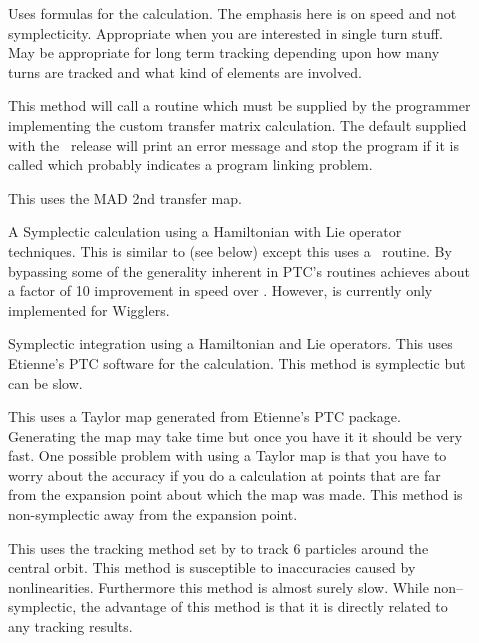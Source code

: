 \begin{description}

\item[]
Uses formulas for the calculation. The emphasis here is on speed and not
symplecticity. Appropriate when you are interested in single turn
stuff. May be appropriate for long term tracking depending upon how
many turns are tracked and what kind of elements are involved. 

\item[]
This method will call a routine  which must be
supplied by the programmer implementing the custom transfer matrix
calculation. The default  supplied with the
\bmad\ release will print an error message and stop the program if it
is called which probably indicates a program linking problem.

\item[]
This uses the MAD 2nd transfer map.

\item[]
A Symplectic calculation using a Hamiltonian with Lie operator techniques.
This is similar to  (see below) except this uses a
\bmad\ routine. By bypassing some of the generality inherent in PTC's routines
 achieves about a factor of 10 improvement in speed over
. However,  is
currently only implemented for Wigglers.

\item[]
Symplectic integration using a Hamiltonian and Lie operators.
This uses Etienne's PTC software for the calculation.
This method is symplectic but can be slow.

\item[]
This uses a Taylor map generated from Etienne's PTC
package. Generating the map may take time but once you have it it
should be very fast. One possible problem with using a Taylor map is
that you have to worry about the accuracy if you do a calculation at points
that are far from the expansion point about which the map was
made. This method is non-symplectic away from the expansion point. 

\item[]
This uses the tracking method set by  to track 6
particles around the central orbit. This method is susceptible to inaccuracies
caused by nonlinearities. Furthermore this method
is almost surely slow. While non--symplectic, the advantage of this method
is that it is directly related to any tracking results.

\end{description}

